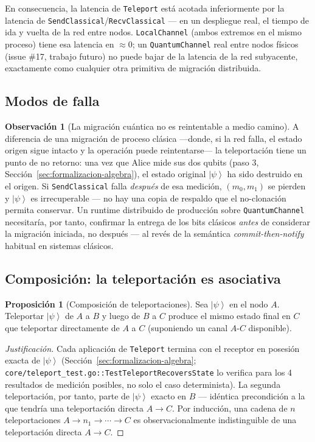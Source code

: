 \documentclass[12pt, a4paper, openany]{report}
\theoremstyle{definition}
\newtheorem{proposition}{Proposición}[chapter]
\newtheorem{remark}{Observación}[chapter]
\newcommand{\ket}[1]{\left|#1\right\rangle}
\begin{document}
En consecuencia, la latencia de \texttt{Teleport} está acotada inferiormente por la latencia de \texttt{SendClassical}/\texttt{RecvClassical} — en un despliegue real, el tiempo de ida y vuelta de la red entre nodos. \texttt{LocalChannel} (ambos extremos en el mismo proceso) tiene esa latencia en $\approx 0$; un \texttt{QuantumChannel} real entre nodos físicos (issue \#17, trabajo futuro) no puede bajar de la latencia de la red subyacente, exactamente como cualquier otra primitiva de migración distribuida.

\subsection{Modos de falla}

\begin{remark}[La migración cuántica no es reintentable a medio camino]
A diferencia de una migración de proceso clásica —donde, si la red falla, el estado origen sigue intacto y la operación puede reintentarse— la teleportación tiene un punto de no retorno: una vez que Alice mide sus dos qubits (paso 3, Sección~\ref{sec:formalizacion-algebra}), el estado original $\ket{\psi}$ ha sido destruido en el origen. Si \texttt{SendClassical} falla \emph{después} de esa medición, $(m_0, m_1)$ se pierden y $\ket{\psi}$ es irrecuperable — no hay una copia de respaldo que el no-clonación permita conservar. Un runtime distribuido de producción sobre \texttt{QuantumChannel} necesitaría, por tanto, confirmar la entrega de los bits clásicos \emph{antes} de considerar la migración iniciada, no después — al revés de la semántica \emph{commit-then-notify} habitual en sistemas clásicos.
\end{remark}

\subsection{Composición: la teleportación es asociativa}

\begin{proposition}[Composición de teleportaciones]
\label{prop:teleport-compose}
Sea $\ket{\psi}$ en el nodo $A$. Teleportar $\ket{\psi}$ de $A$ a $B$ y luego de $B$ a $C$ produce el mismo estado final en $C$ que teleportar directamente de $A$ a $C$ (suponiendo un canal $A$-$C$ disponible).
\end{proposition}
\begin{proof}[Justificación]
Cada aplicación de \texttt{Teleport} termina con el receptor en posesión exacta de $\ket{\psi}$ (Sección~\ref{sec:formalizacion-algebra}; \texttt{core/teleport\_test.go::TestTeleportRecoversState} lo verifica para los 4 resultados de medición posibles, no solo el caso determinista). La segunda teleportación, por tanto, parte de $\ket{\psi}$ exacto en $B$ — idéntica precondición a la que tendría una teleportación directa $A\to C$. Por inducción, una cadena de $n$ teleportaciones $A\to n_1\to\cdots\to C$ es observacionalmente indistinguible de una teleportación directa $A\to C$.
\end{proof}
\end{document}

